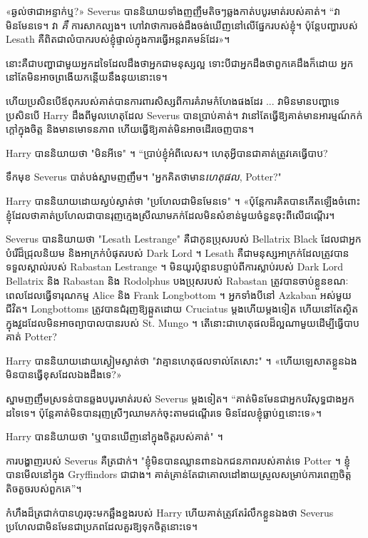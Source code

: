 {{{«ឆ្ងល់ថាជាអន្ទាក់ឬ?» Severus បាននិយាយទាំងញញឹមតិចៗឆ្លងកាត់បបូរមាត់របស់គាត់។ “វាមិនមែនទេ។ វា \emph{គឺ} ការសាកល្បង។ ហៅវាថាការចង់ដឹងចង់ឃើញនៅលើផ្នែករបស់ខ្ញុំ។ ប៉ុន្តែ​បញ្ហា​របស់ Lesath គឺ​ពិត​ជា​លំបាក​របស់​ខ្ញុំ​ផ្ទាល់​ក្នុង​ការ​ធ្វើ​អន្តរាគមន៍​ដែរ»។

នោះគឺជាបញ្ហាជាមួយអ្នកដទៃដែលដឹងថាអ្នកជាមនុស្សល្អ ទោះបីជាអ្នកដឹងថាពួកគេដឹងក៏ដោយ អ្នកនៅតែមិនអាចព្រងើយកន្តើយនឹងនុយនោះទេ។

ហើយប្រសិនបើឪពុករបស់គាត់បានការពារសិស្សពីការគំរាមកំហែងផងដែរ ... វាមិនមានបញ្ហាទេប្រសិនបើ Harry ដឹងពីមូលហេតុដែល Severus បានប្រាប់គាត់។ វានៅតែធ្វើឱ្យគាត់មានអារម្មណ៍កក់ក្តៅក្នុងចិត្ត និងមានមោទនភាព ហើយធ្វើឱ្យគាត់មិនអាចដើរចេញបាន។

Harry បាននិយាយថា "មិនអីទេ" ។ “ប្រាប់ខ្ញុំអំពីលេស។ ហេតុ​អ្វី​បាន​ជា​គាត់​ត្រូវ​គេ​ធ្វើ​បាប?

ទឹកមុខ Severus បាត់បង់ស្នាមញញឹម។ "អ្នកគិតថាមាន\emph{ហេតុផល}, Potter?"

Harry បាននិយាយដោយស្ងប់ស្ងាត់ថា "ប្រហែលជាមិនមែនទេ" ។ «​ប៉ុន្តែ​ការ​គិត​បាន​កើត​ឡើង​ចំពោះ​ខ្ញុំ​ដែល​ថា​គាត់​ប្រហែល​ជា​បាន​រុញ​ក្មេងស្រី​ឈាម​ភក់​ដែល​មិន​សំខាន់​មួយ​ចំនួន​ចុះ​ពីលើ​ជណ្តើរ។

Severus បាននិយាយថា "Lesath Lestrange" គឺជាកូនប្រុសរបស់ Bellatrix Black ដែលជាអ្នកបំរើដ៏ជ្រុលនិយម និងអាក្រក់បំផុតរបស់ Dark Lord ។ Lesath គឺជាមនុស្សអាក្រក់ដែលត្រូវបានទទួលស្គាល់របស់ Rabastan Lestrange ។ មិនយូរប៉ុន្មានបន្ទាប់ពីការស្លាប់របស់ Dark Lord Bellatrix និង Rabastan និង Rodolphus បងប្រុសរបស់ Rabastan ត្រូវបានចាប់ខ្លួនខណៈពេលដែលធ្វើទារុណកម្ម Alice និង Frank Longbottom ។ អ្នកទាំងបីនៅ Azkaban អស់មួយជីវិត។ Longbottoms ត្រូវបានជំរុញឱ្យឆ្កួតដោយ Cruciatus ម្តងហើយម្តងទៀត ហើយនៅតែស្ថិតក្នុងវួដដែលមិនអាចព្យាបាលបានរបស់ St. Mungo ។ តើ​នោះ​ជា​ហេតុផល​ដ៏​ល្អ​ណា​មួយ​ដើម្បី​ធ្វើ​បាប​គាត់ Potter?

Harry បាននិយាយដោយស្ងៀមស្ងាត់ថា "វាគ្មានហេតុផលទាល់តែសោះ" ។ «​ហើយ​ឡេសាត​ខ្លួន​ឯង​មិន​បាន​ធ្វើ​ខុស​ដែល​ឯង​ដឹង​ទេ?»

ស្នាម​ញញឹម​ស្រទន់​បាន​ឆ្លង​បបូរមាត់​របស់ Severus ម្ដង​ទៀត។ “គាត់​មិន​មែន​ជា​អ្នក​បរិសុទ្ធ​ជាង​អ្នក​ដទៃ​ទេ។ ប៉ុន្តែ​គាត់​មិន​បាន​រុញ​ស្រីៗ​ឈាម​ភក់​ចុះ​តាម​ជណ្តើរ​ទេ មិន​ដែល​ខ្ញុំ​ធ្លាប់​ឮ​នោះ​ទេ»។

Harry បាននិយាយថា "ឬបានឃើញនៅក្នុងចិត្តរបស់គាត់" ។

ការបង្ហាញរបស់ Severus គឺត្រជាក់។ "ខ្ញុំមិនបានឈ្លានពានឯកជនភាពរបស់គាត់ទេ Potter ។ ខ្ញុំបានមើលនៅក្នុង Gryffindors ជាជាង។ គាត់គ្រាន់តែជាគោលដៅងាយស្រួលសម្រាប់ការពេញចិត្តតិចតួចរបស់ពួកគេ”។

កំហឹងដ៏ត្រជាក់បានហូរចុះមកឆ្អឹងខ្នងរបស់ Harry ហើយគាត់ត្រូវតែរំលឹកខ្លួនឯងថា Severus ប្រហែលជាមិនមែនជាប្រភពដែលគួរឱ្យទុកចិត្តនោះទេ។

}}}

